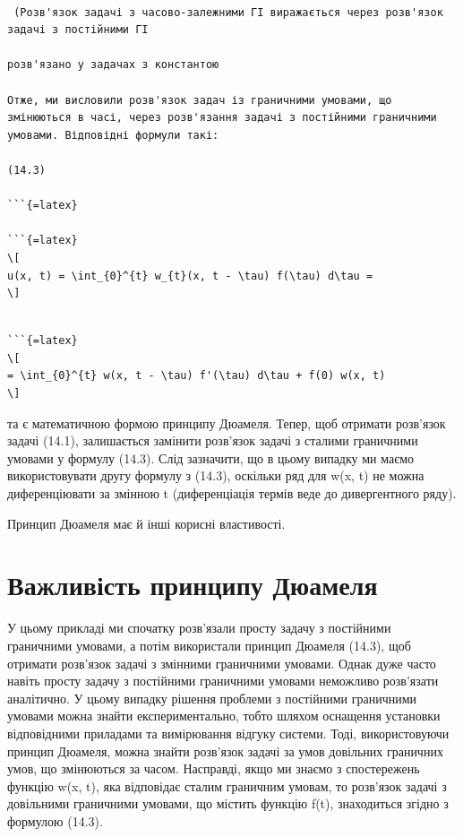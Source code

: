 \documentclass[
  ukrainian,
]{article}
\begin{document}
\begin{verbatim}

 (Розв'язок задачі з часово-залежними ГІ виражається через розв'язок задачі з постійними ГІ

розв'язано у задачах з константою

Отже, ми висловили розв'язок задач із граничними умовами, що змінюються в часі, через розв'язання задачі з постійними граничними умовами. Відповідні формули такі:

(14.3)

```{=latex}

```{=latex}
\[
u(x, t) = \int_{0}^{t} w_{t}(x, t - \tau) f(\tau) d\tau =
\]
\end{verbatim}

\begin{verbatim}

```{=latex}
\[
= \int_{0}^{t} w(x, t - \tau) f'(\tau) d\tau + f(0) w(x, t)
\]
\end{verbatim}

та є математичною формою принципу Дюамеля. Тепер, щоб отримати розв'язок
задачі (14.1), залишається замінити розв'язок задачі з сталими
граничними умовами у формулу (14.3). Слід зазначити, що в цьому випадку
ми маємо використовувати другу формулу з (14.3), оскільки ряд для w(x,
t) не можна диференціювати за змінною t (диференціація термів веде до
дивергентного ряду).

Принцип Дюамеля має й інші корисні властивості.

\section{Важливість принципу
Дюамеля}\label{ux432ux430ux436ux43bux438ux432ux456ux441ux442ux44c-ux43fux440ux438ux43dux446ux438ux43fux443-ux434ux44eux430ux43cux435ux43bux44f}

У цьому прикладі ми спочатку розв'язали просту задачу з постійними
граничними умовами, а потім використали принцип Дюамеля (14.3), щоб
отримати розв'язок задачі з змінними граничними умовами. Однак дуже
часто навіть просту задачу з постійними граничними умовами неможливо
розв'язати аналітично. У цьому випадку рішення проблеми з постійними
граничними умовами можна знайти експериментально, тобто шляхом оснащення
установки відповідними приладами та вимірювання відгуку системи. Тоді,
використовуючи принцип Дюамеля, можна знайти розв'язок задачі за умов
довільних граничних умов, що змінюються за часом. Насправді, якщо ми
знаємо з спостережень функцію w(x, t), яка відповідає сталим граничним
умовам, то розв'язок задачі з довільними граничними умовами, що містить
функцію f(t), знаходиться згідно з формулою (14.3).
\end{document}
